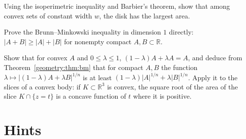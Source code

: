 \begin{exercise}[$\star\star$]\label{geometry:ex:constwidthdisk}
Using the isoperimetric inequality and Barbier's theorem, show that among convex sets of constant width $w$, the disk has the largest area.
\end{exercise}

\begin{exercise}[$\star$]\label{geometry:ex:bmone}
Prove the Brunn--Minkowski inequality in dimension $1$ directly: $|A+B|\ge|A|+|B|$ for nonempty compact $A,B\subset\mathbb R$.
\end{exercise}

\begin{exercise}[$\star\star$]\label{geometry:ex:bmconcave}
Show that for convex $A$ and $0\le\lambda\le1$, $(1-\lambda)A+\lambda A=A$, and deduce from Theorem~\ref{geometry:thm:bm} that for compact $A,B$ the function
$\lambda\mapsto|(1-\lambda)A+\lambda B|^{1/n}$ is at least $(1-\lambda)|A|^{1/n}+\lambda|B|^{1/n}$. Apply it to the slices of a convex body: if $K\subset\mathbb R^3$ is convex,
the square root of the area of the slice $K\cap\{z=t\}$ is a concave function of $t$ where it is positive.
\end{exercise}

\section{Hints}

